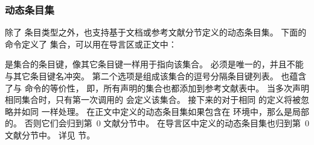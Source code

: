 \subsubsection{动态条目集}%
\label{use:bib:set}


除了  条目类型之外，\biblatex 也支持基于文档或参考文献分节定义的动态条目集。
下面的命令定义了  集合，可以用在导言区或正文中：

\begin{ltxsyntax}



 是集合的条目键，像其它条目键一样用于指向该集合。
 必须是唯一的，并且不能与其它条目键名冲突。
第二个选项是组成该集合的逗号分隔条目键列表。
 也蕴含了与  命令的等价性，
即，所有声明的集合也都添加到参考文献表中。
当多次声明相同集合时，只有第一次调用的  会定义该集合。
接下来的对于相同  的定义将被忽略并如同  一样处理。
在正文中定义的动态条目集如果包含在  环境中，那么是局部的。
否则它们会归到第~0 文献分节中。
在导言区中定义的动态条目集也归到第~0 文献分节中。
详见  节。

\end{ltxsyntax}

